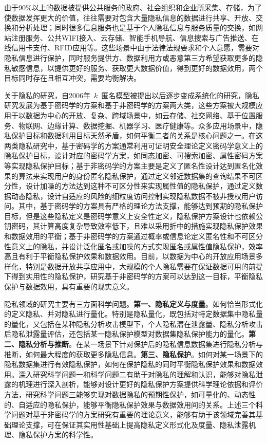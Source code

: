 由于90\%以上的数据被提供公共服务的政府、社会组织和企业所采集、存储，为了使数据发挥更大的价值，往往需要对包含大量隐私信息的数据进行共享、开放、交换和分析处理；同时很多信息服务也是基于个人隐私信息与服务质量的交换，如网站注册服务、公共WIFI接入、云存储、智能手机导航、信息搜索与广告推送、在线信用卡支付、RFID应用等。这些场景中由于法律法规要求和个人意愿，需要对隐私信息进行保护，同时服务提供方、数据利用方或恶意第三方希望获取更多的隐私敏感信息，以提供更好的服务、获取更大数据价值，得到更好的数据效用，两个目标同时存在且相互冲突，需要均衡解决。

关于隐私的研究，自2006年~$k$~匿名模型\cite{sweeney2002k}被提出以后逐步变成系统化的研究，隐私研究发展为基于密码学的方案\cite{nabeel2014privacy,huang2015review}和基于非密码学的方案\cite{sweeney2002k,machanavajjhala2007l,li2007t,dwork2006differential,zhang2018privacy}两大类，这些方案被大规模应用于以数据为中心的开放、复杂、跨域场景中，如云存储、社交网络、基于位置服务、物联网、边缘计算、数据挖掘、机器学习、医疗健康等。众多应用场景中，隐私保护目标和数据利用目标天然矛盾，如何平衡二者的关系是核心问题之一。在这两类隐私研究中，基于密码学的方案通常利用可证明安全理论定义密码学意义上的隐私保护目标，设计对应的密码学方案，如同态加密、可搜索加密、属性密码方案等实现隐私保护目标\cite{nabeel2014privacy,huang2015review}；基于非密码学的方案主要是定义了匿名性设计达到匿名化效果的算法来实现用户的身份匿名隐私保护\cite{sweeney2002k,machanavajjhala2007l,li2007t}，通过定义邻近数据集的查询结果不可区分性，设计加噪的方法达到这种不可区分性来实现属性值的隐私保护\cite{dwork2006differential}，通过定义数据动态隐私，设计自适应的风险的细粒度访问控制实现隐私数据不被非授权用户访问\cite{zhang2018privacy}。其中，基于密码学的方案具有严格的理论方法支撑，能够达到预期的隐私保护目标，但是这些隐私定义是密码学意义上安全性定义，隐私保护方案设计也依赖公钥密码，其计算高度复杂导致效率低下，且难以采用折中的措施实现隐私保护效果和数据效用的平衡；基于非密码学的方案通过概率或信息论定义匿名性和不可区分性意义上的隐私，并设计泛化匿名或加噪的方式实现匿名或属性值隐私保护，效率高且有利于平衡隐私保护效果和数据效用。目前，以数据为中心的开放应用场景多样化，特别是数据开放共享应用中，大规模的个人隐私需要在保证数据可用的前提下得到实用性的隐私保护，研究基于非密码学的方案可以达到这一目标，平衡隐私保护与数据效用，具有重要的现实意义。

隐私领域的研究主要有三方面科学问题。\textbf{第一、隐私定义与度量}。如何恰当形式化的定义隐私、并对隐私进行量化。特别是隐私量化，既包括对特定数据集中隐私量的量化，又包括在某种隐私分析攻击模型下，个人隐私潜在泄露量、隐私分析攻击后隐私泄露量评估，还包括某一隐私保护模型对数据集隐私保护能力的量化。\textbf{第二、隐私分析与推断}。在某一场景下针对保护后的隐私信息数据集进行隐私分析与推断，如何最大程度的获取更多隐私信息。\textbf{第三、隐私保护}。如何对某一场景下的隐私数据集进行有效隐私保护，如何在保护隐私的同时平衡隐私保护效果和数据效用。深入研究科学问题一和科学问题二有助于对隐私的理解和认识，能够对隐私泄露的机理进行深入剖析，能够对设计更好的隐私保护方案提供科学理论依据和评价方法，研究科学问题三能够实现对数据隐私的预期性保护，如可量化的、动态性的、自适应的隐私保护，能够平衡隐私保护效果与数据效用间的关系。上述三个科学问题对基于非密码学的方案研究有重要的理论意义，能够有助于该领域完善其基础理论支撑，可在保证其实用性基础上提高隐私定义形式化及度量、隐私泄露机理、隐私保护方案的科学性。

